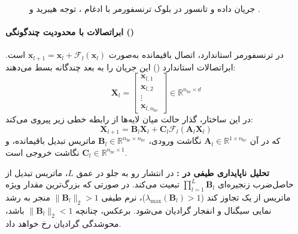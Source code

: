 \begin{figure}[htbp]
{%
}
\caption{جریان داده و تانسور در بلوک ترنسفورمر  با ادغام ، توجه هیبرید و .}
\label{fig:deepseek_v4_transformer_block}
\end{figure}

\paragraph*{ابراتصالات با محدودیت چندگونگی ()}
در ترنسفورمر استاندارد، اتصال باقیمانده به‌صورت $\mathbf{x}_{l+1} = \mathbf{x}_l + \mathcal{F}_l(\mathbf{x}_l)$ است. ابراتصالات استاندارد () \cite{zhu2025hyper} این جریان را به بعد چندگانه بسط می‌دهند:
\begin{equation}
    \mathbf{X}_l = \begin{bmatrix} \mathbf{x}_{l,1} \\ \mathbf{x}_{l,2} \\ \vdots \\ \mathbf{x}_{l,n_{\text{hc}}} \end{bmatrix} \in \mathbb{R}^{n_{\text{hc}} \times d}
\end{equation}
در این ساختار، گذار حالت میان لایه‌ها از رابطه خطی زیر پیروی می‌کند:
\begin{equation}
    \mathbf{X}_{l+1} = \mathbf{B}_l \mathbf{X}_l + \mathbf{C}_l \mathcal{F}_l(\mathbf{A}_l \mathbf{X}_l)
\end{equation}
که در آن $\mathbf{A}_l \in \mathbb{R}^{1 \times n_{\text{hc}}}$ نگاشت ورودی، $\mathbf{B}_l \in \mathbb{R}^{n_{\text{hc}} \times n_{\text{hc}}}$ ماتریس تبدیل باقیمانده، و $\mathbf{C}_l \in \mathbb{R}^{n_{\text{hc}} \times 1}$ نگاشت خروجی است.

\textbf{تحلیل ناپایداری طیفی در :}
در انتشار رو به جلو در عمق $L$، ماتریس تبدیل از حاصل‌ضرب زنجیره‌ای $\prod_{l=1}^L \mathbf{B}_l$ تبعیت می‌کند. در صورتی که بزرگ‌ترین مقدار ویژه ماتریس از یک تجاوز کند ($\lambda_{\max}(\mathbf{B}_l) > 1$)، نرم طیفی $\|\mathbf{B}_l\|_2 > 1$ منجر به رشد نمایی سیگنال و انفجار گرادیان می‌شود. برعکس، چنانچه $\|\mathbf{B}_l\|_2 < 1$ باشد، محوشدگی گرادیان رخ خواهد داد.

